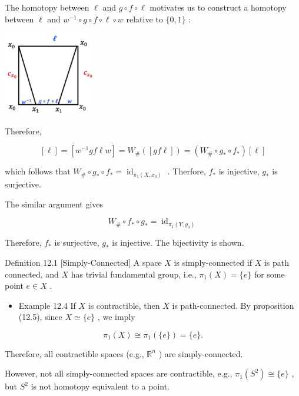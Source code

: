 The homotopy between \(\ell\) and \(g \circ  f \circ  \ell\) motivates us to construct a homotopy between \(\ell\) and \({w}^{-1} \circ  g \circ  f \circ  \ell  \circ  w\) relative to \(\{ 0,1\}\) :

\begin{center}
\includegraphics[max width=0.3\textwidth]{images/bo_d2bcsrref24c73avs720_123_631_1071_449_410_0.jpg}
\end{center}
\hspace*{3em} 

Therefore,

\[
\left\lbrack  \ell \right\rbrack   = \left\lbrack  {{w}^{-1}{gf}\ell w}\right\rbrack   = {W}_{\# }\left( \left\lbrack  {{gf}\ell }\right\rbrack  \right)  = \left( {{W}_{\# } \circ  {g}_{ * } \circ  {f}_{ * }}\right) \left\lbrack  \ell \right\rbrack
\]

which follows that \({W}_{\# } \circ  {g}_{ * } \circ  {f}_{ * } = {\operatorname{id}}_{{\pi }_{1}\left( {X,{x}_{0}}\right) }\) . Therfore, \({f}_{ * }\) is injective, \({g}_{ * }\) is surjective.

The similar argument gives

\[
{W}_{\# } \circ  {f}_{ * } \circ  {g}_{ * } = {\operatorname{id}}_{{\pi }_{1}\left( {Y,{y}_{0}}\right) }
\]

Therefore, \({f}_{ * }\) is surjective, \({g}_{ * }\) is injective. The bijectivity is shown.

Definition 12.1 [Simply-Connected] A space \(X\) is simply-connected if \(X\) is path connected, and \(X\) has trivial fundamental group, i.e., \({\pi }_{1}\left( X\right)  = \{ e\}\) for some point \(e \in  X\) .

\begin{itemize}
\item Example 12.4 If \(X\) is contractible, then \(X\) is path-connected. By proposition (12.5), since \(X \simeq  \{ e\}\) , we imply
\end{itemize}

\[
{\pi }_{1}\left( X\right)  \cong  {\pi }_{1}\left( {\{ e\} }\right)  = \{ e\} .
\]

Therefore, all contractible spaces (e.g., \({\mathbb{R}}^{n}\) ) are simply-connected.

However, not all simply-connected spaces are contractible, e.g., \({\pi }_{1}\left( {S}^{2}\right)  \cong  \{ e\}\) , but \({S}^{2}\) is not homotopy equivalent to a point.